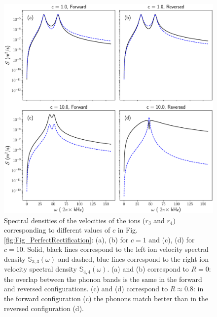 \begin{figure}[t]
  \centering
  \includegraphics[width=\linewidth]{Figures/SpectrumComparative.pdf}
  \caption{Spectral densities of the velocities of the ions ($r_3$ and $r_4$) corresponding to different values of $c$ in Fig. \ref{fig:Fig_PerfectRectification}: (a), (b) for $c=1$ and (c), (d) for $c=10$. Solid, black lines correspond to the left ion velocity spectral density $\mathbb{S}_{3,3}(\omega)$ and dashed, blue lines correspond to the right ion velocity spectral density $\mathbb{S}_{4,4}(\omega)$. (a) and (b) correspond to $R = 0$:  the overlap between the phonon bands is the same in the forward and reversed configurations. (c) and (d) correspond to $R\approx 0.8$:  in the forward configuration (c)  the phonons match better than in the reversed configuration (d).}
  \label{fig:Figure_Spectra}
\end{figure}


